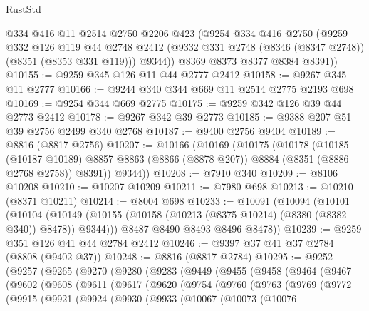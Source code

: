 \begin{lexlean}{RustStd}
\begin{coremodule}
{\begin{coremodule}
{{{{{{{{{{{{{{{{{{{{{{{{{{{{{{{{{{{{{{{{{{{{{{{{{{        @334
        @416
        @11
        @2514
        @2750
        @2206
        @423
        (@9254
          @334
          @416
          @2750
          (@9259
            @332
            @126
            @119
            @44
            @2748
            @2412
            (@9332 @331 @2748 (@8346 (@8347 @2748)) (@8351 (@8353 @331 @119)))
            @9344))
        @8369
        @8373
        @8377
        @8384
        @8391))
@10155 := @9259 @345 @126 @11 @44 @2777 @2412
@10158 := @9267 @345 @11 @2777
@10166 := @9244 @340 @344 @669 @11 @2514 @2775 @2193 @698
@10169 := @9254 @344 @669 @2775
@10175 := @9259 @342 @126 @39 @44 @2773 @2412
@10178 := @9267 @342 @39 @2773
@10185 := @9388 @207 @51 @39 @2756 @2499 @340 @2768
@10187 := @9400 @2756 @9404
@10189 := @8816 (@8817 @2756)
@10207 := @10166
    (@10169
      (@10175
        (@10178
          (@10185
            (@10187 @10189)
            @8857
            @8863
            (@8866 (@8878 @207))
            @8884
            (@8351 (@8886 @2768 @2758))
            @8391))
        @9344))
@10208 := @7910 @340
@10209 := @8106 @10208
@10210 := @10207 @10209
@10211 := @7980 @698
@10213 := @10210 (@8371 @10211)
@10214 := @8004 @698
@10233 := @10091
    (@10094
      (@10101
        (@10104 (@10149 (@10155 (@10158 (@10213 (@8375 @10214) (@8380 (@8382 @340)) @8478)) @9344)))
        @8487
        @8490
        @8493
        @8496
        @8478))
@10239 := @9259 @351 @126 @41 @44 @2784 @2412
@10246 := @9397 @37 @41 @37 @2784 (@8808 (@9402 @37))
@10248 := @8816 (@8817 @2784)
@10295 := @9252
    (@9257
      (@9265
        (@9270
          (@9280
            (@9283
              (@9449
                (@9455
                  (@9458
                    (@9464
                      (@9467
                        (@9602
                          (@9608
                            (@9611
                              (@9617
                                (@9620
                                  (@9754
                                    (@9760
                                      (@9763
                                        (@9769
                                          (@9772
                                            (@9915
                                              (@9921
                                                (@9924
                                                  (@9930
                                                    (@9933
                                                      (@10067
                                                        (@10073
                                                          (@10076
}}}}}}}}}}}}}}}}}}}}}}}}}}}}}}}}}}}}}}}}}}}}}}}}}}
\end{coremodule}}
\end{coremodule}
\end{lexlean}
